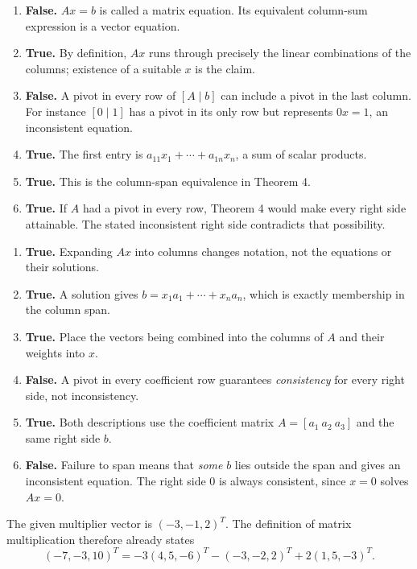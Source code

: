 \begin{enumerate}[label=(\alph*)]
\item \textbf{False.} $Ax=b$ is called a matrix equation. Its equivalent
column-sum expression is a vector equation.
\item \textbf{True.} By definition, $Ax$ runs through precisely the linear
combinations of the columns; existence of a suitable $x$ is the claim.
\item \textbf{False.} A pivot in every row of $[A\mid b]$ can include a
pivot in the last column. For instance $[0\mid1]$ has a pivot in its
only row but represents $0x=1$, an inconsistent equation.
\item \textbf{True.} The first entry is
$a_{11}x_1+\cdots+a_{1n}x_n$, a sum of scalar products.
\item \textbf{True.} This is the column-span equivalence in Theorem 4.
\item \textbf{True.} If $A$ had a pivot in every row, Theorem 4 would
make every right side attainable. The stated inconsistent right side
contradicts that possibility.
\end{enumerate}

\begin{enumerate}[label=(\alph*)]
\item \textbf{True.} Expanding $Ax$ into columns changes notation,
not the equations or their solutions.
\item \textbf{True.} A solution gives $b=x_1a_1+\cdots+x_na_n$,
which is exactly membership in the column span.
\item \textbf{True.} Place the vectors being combined into the columns
of $A$ and their weights into $x$.
\item \textbf{False.} A pivot in every coefficient row guarantees
\emph{consistency} for every right side, not inconsistency.
\item \textbf{True.} Both descriptions use the coefficient matrix
$A=[a_1\ a_2\ a_3]$ and the same right side $b$.
\item \textbf{False.} Failure to span means that \emph{some} $b$ lies
outside the span and gives an inconsistent equation. The right side
$0$ is always consistent, since $x=0$ solves $Ax=0$.
\end{enumerate}

The given multiplier vector is $(-3,-1,2)^T$. The definition of
matrix multiplication therefore already states
\[(-7,-3,10)^T=-3(4,5,-6)^T-(-3,-2,2)^T+2(1,5,-3)^T.\]

